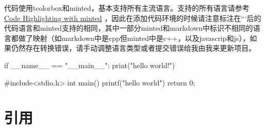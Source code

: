 \documentclass{article}%
\begin{document}
%
代码使用tcolorbox和minted，基本支持所有主流语言。支持的所有语言请参考 \href{https://www.overleaf.com/learn/latex/Code_Highlighting_with_minted}{Code Highlighting with minted} ，因此在添加代码环境的时候请注意标注在```后的代码语言和minted支持的相同，其中一部分minted和markdown中标识不相同的语言都做了映射（如markdown中是cpp但minted中是c++，以及javascrip和js），如果仍然存在转换错误，请手动调整语言类型或者提交错误给我由我来更新项目。%

%
\begin{langbox}[Python]%
if __name__ == "__main__":%
print("hello world!")%
\end{langbox}%
%

%
\begin{langbox}[C++]%
#include<stdio.h>%
int main(){%
printf("hello world")%
return 0;%
}%
%
\end{langbox}%
%

%
\section{引用}%
\end{document}
